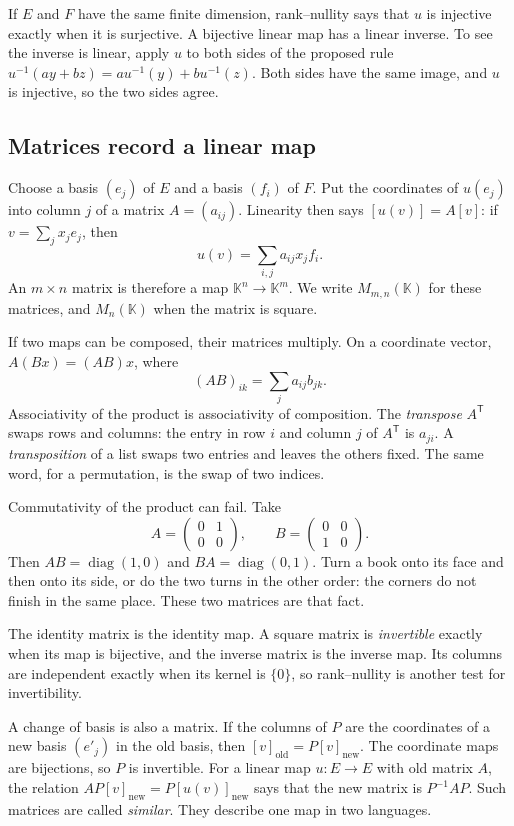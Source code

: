 If $E$ and $F$ have the same finite dimension, rank--nullity says that $u$ is injective exactly when it is surjective. A bijective linear map has a linear inverse. To see the inverse is linear, apply $u$ to both sides of the proposed rule $u^{-1}(ay+bz)=au^{-1}(y)+bu^{-1}(z)$. Both sides have the same image, and $u$ is injective, so the two sides agree.

\subsection*{Matrices record a linear map}

Choose a basis $(e_j)$ of $E$ and a basis $(f_i)$ of $F$. Put the coordinates of $u(e_j)$ into column $j$ of a matrix $A=(a_{ij})$. Linearity then says $[u(v)]=A[v]$: if $v=\sum_jx_je_j$, then
\[
u(v)=\sum_{i,j}a_{ij}x_jf_i.
\]
An $m\times n$ matrix is therefore a map $\mathbb K^n\to\mathbb K^m$. We write $M_{m,n}(\mathbb K)$ for these matrices, and $M_n(\mathbb K)$ when the matrix is square.

If two maps can be composed, their matrices multiply. On a coordinate vector, $A(Bx)=(AB)x$, where
\[
(AB)_{ik}=\sum_ja_{ij}b_{jk}.
\]
Associativity of the product is associativity of composition. The \emph{transpose} $A^{\mathsf T}$ swaps rows and columns: the entry in row $i$ and column $j$ of $A^{\mathsf T}$ is $a_{ji}$. A \emph{transposition} of a list swaps two entries and leaves the others fixed. The same word, for a permutation, is the swap of two indices.

Commutativity of the product can fail. Take
\[
A=\begin{pmatrix}0&1\\0&0\end{pmatrix},\qquad B=\begin{pmatrix}0&0\\1&0\end{pmatrix}.
\]
Then $AB=\operatorname{diag}(1,0)$ and $BA=\operatorname{diag}(0,1)$. Turn a book onto its face and then onto its side, or do the two turns in the other order: the corners do not finish in the same place. These two matrices are that fact.

The identity matrix is the identity map. A square matrix is \emph{invertible} exactly when its map is bijective, and the inverse matrix is the inverse map. Its columns are independent exactly when its kernel is $\{0\}$, so rank--nullity is another test for invertibility.

A change of basis is also a matrix. If the columns of $P$ are the coordinates of a new basis $(e'_j)$ in the old basis, then $[v]_{\mathrm{old}}=P[v]_{\mathrm{new}}$. The coordinate maps are bijections, so $P$ is invertible. For a linear map $u:E\to E$ with old matrix $A$, the relation $AP[v]_{\mathrm{new}}=P[u(v)]_{\mathrm{new}}$ says that the new matrix is $P^{-1}AP$. Such matrices are called \emph{similar}. They describe one map in two languages.


